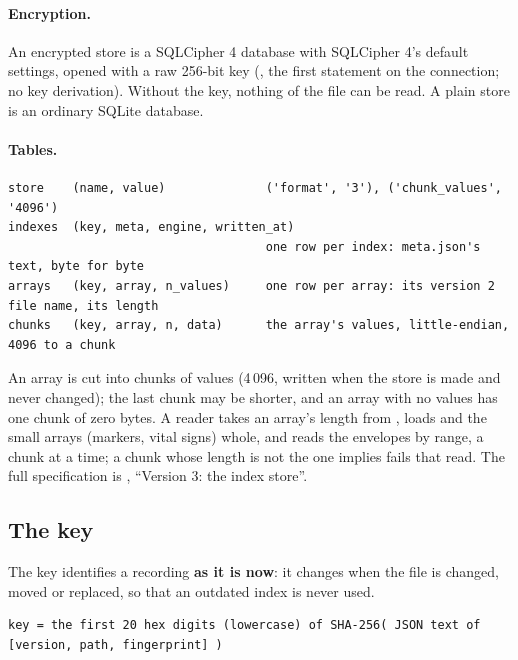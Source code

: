 \paragraph{Encryption.} An encrypted store is a SQLCipher 4 database with SQLCipher 4's default
settings, opened with a raw 256-bit key (, the first
statement on the connection; no key derivation). Without the key, nothing of the file can be read.
A plain store is an ordinary SQLite database.

\paragraph{Tables.}
\begin{lstlisting}[style=text]
store    (name, value)              ('format', '3'), ('chunk_values', '4096')
indexes  (key, meta, engine, written_at)
                                    one row per index: meta.json's text, byte for byte
arrays   (key, array, n_values)     one row per array: its version 2 file name, its length
chunks   (key, array, n, data)      the array's values, little-endian, 4096 to a chunk
\end{lstlisting}
An array is cut into chunks of  values (4\,096, written when the store is
made and never changed); the last chunk may be shorter, and an array with no values has one chunk
of zero bytes. A reader takes an array's length from , loads  and
the small arrays (markers, vital signs) whole, and reads the envelopes by range, a chunk at a
time; a chunk whose length is not the one  implies fails that read. The full
specification is , ``Version 3: the index
store''.

\subsection{The key}
\label{sec:formats-reference-key}

The key identifies a recording \textbf{as it is now}: it changes when the file is changed, moved
or replaced, so that an outdated index is never used.
\begin{lstlisting}[style=text]
key = the first 20 hex digits (lowercase) of SHA-256( JSON text of [version, path, fingerprint] )
\end{lstlisting}

